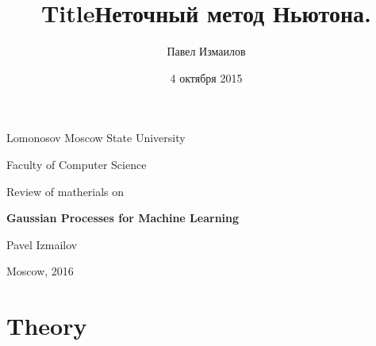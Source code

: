 \documentclass[12pt]{article}
\title{Title}
\title{Неточный метод Ньютона.}
\date{4 октября 2015}
\author{Павел Измаилов}
\begin{document}
\renewcommand{\contentsname}{\centerline{\bf Contents}}
\renewcommand{\refname}{\centerline{\bf Literature}}

\newcommand{\GP}{\mathcal{GP}}
\newcommand{\E}{\mathbb{E}}
\newcommand{\R}{\mathbb{R}}
\newcommand{\N}{\mathcal{N}}
\newcommand{\cov}{\mbox{cov}}
\newcommand{\Nystrom}{Nystr\"{o}m }
\newcommand{\KL}[2]{\mbox{KL}\left(#1\mbox{ || }#2\right)}
\newcommand{\tr}{\mbox{tr}}
\newcommand{\derivative}[2]{\frac{\partial #1}{\partial #2}}
\newcommand{\sndderivative}[3]{\frac{\partial^2 #1}{\partial #2 \partial #3}}
\newcommand{\bigO}{\mathcal{O}}

\newlength{\arrayrulewidthOriginal}
\newcommand{\Cline}[2]{%
  \noalign{\global\setlength{\arrayrulewidthOriginal}{\arrayrulewidth}}%
  \noalign{\global\setlength{\arrayrulewidth}{#1}}\cline{#2}%
  \noalign{\global\setlength{\arrayrulewidth}{\arrayrulewidthOriginal}}}

\newtheorem{definition}{Definition}
\newtheorem{theorem}{Theorem}


\def\vec#1{\mathchoice{\mbox{\boldmath$\displaystyle#1$}}
{\mbox{\boldmath$\textstyle#1$}} {\mbox{\boldmath$\scriptstyle#1$}} {\mbox{\boldmath$\scriptscriptstyle#1$}}}

\centerline{Lomonosov Moscow State University}

\centerline{Faculty of Computer Science}

\vspace{5 cm}

\centerline{\Large Review of matherials on}

\vspace{1 cm}

\centerline{\Large \bf Gaussian Processes for Machine Learning}

\vspace{6 cm}

\begin{flushright}

Pavel Izmailov
\end{flushright}

\vfill 

\centerline{Moscow,  2016}
\thispagestyle{empty} 
\pagebreak

\section{Theory}
\end{document}
